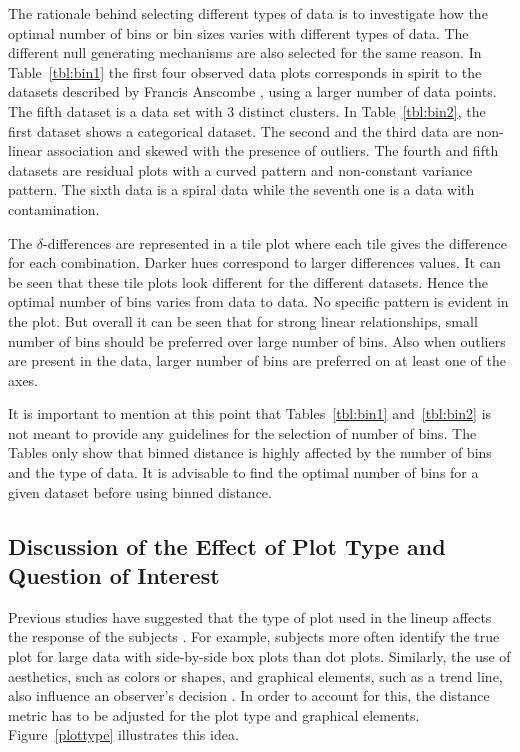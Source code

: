 \documentclass[12pt]{article}\usepackage[]{graphicx}\usepackage[]{color}
\begin{document}
The rationale behind selecting different types of data is to investigate how the optimal number of bins or bin sizes varies with different types of data. The different null generating mechanisms are also selected for the same reason. In Table~\ref{tbl:bin1} the first four observed data plots corresponds in spirit to the datasets described by Francis Anscombe \citep{anscombe:1972}, using a larger number of data points. 
The fifth dataset is a data set with 3 distinct clusters. In Table~\ref{tbl:bin2}, the first dataset shows a categorical dataset. The second and the third data are non-linear association and skewed with the presence of outliers. The fourth and fifth datasets are residual plots with a curved pattern and non-constant variance pattern. The sixth data is a spiral data while the seventh one is a data with contamination. 

The $\delta$-differences are represented in a tile plot where each tile gives the difference for each combination. Darker hues correspond to larger differences values. It can be seen that these tile plots look different for the different datasets. Hence the optimal number of bins varies from data to data. No specific pattern is evident in the plot. But overall it can be seen that for strong linear relationships, small number of bins should be preferred over large number of bins. Also when outliers are present in the data, larger number of bins are preferred on at least one of the axes.

It is important to mention at this point that Tables~\ref{tbl:bin1} and~\ref{tbl:bin2} is not meant to provide any guidelines for the selection of number of bins. The Tables only show that binned distance is highly affected by the number of bins and the type of data. It is advisable to find the optimal number of bins for a given dataset before using binned distance.

\subsection{Discussion of the Effect of Plot Type and Question of Interest} \label{sec:plot_type}

Previous studies have suggested that the type of plot used in the lineup affects the response of the subjects \citep{hofmann2012graphical, zhao:2012}. For example, subjects more often identify the true plot for large data with side-by-side box plots than dot plots. Similarly, the use of aesthetics, such as colors or shapes, and graphical elements, such as a trend line, also influence an observer's decision \citep{vanderplas:2016}. In order to account for this, the distance metric has to be adjusted for the plot type and graphical elements. 
Figure~\ref{plottype} illustrates this idea. 
\end{document}

